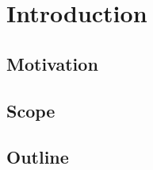 \chapter{Introduction}
\label{chap:1_introduction}

\section{Motivation}

\begin{comment} 




\end{comment} 

\section{Scope}
\section{Outline}
